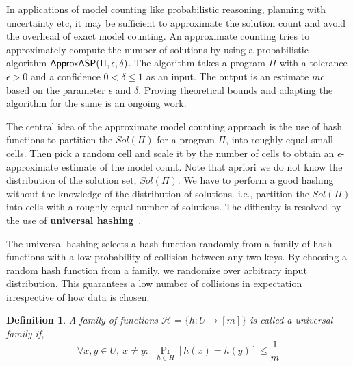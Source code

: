 \documentclass{article}
\newtheorem{definition}{Definition}
\newcommand{\fff}{\ensuremath{\Pi}\xspace}
\newcommand{\mc}{$mc$\xspace}
\newcommand{\ep}{$\epsilon$\xspace}
\newcommand{\del}{$\delta$\xspace}
\def\appasp{\normalfont \textsf{ApproxASP}\xspace}
\newcommand{\sol}{$Sol(\Pi)$\xspace}
\begin{document}
In applications of model counting like probabilistic reasoning, planning with uncertainty etc, it may be sufficient to approximate the solution count and avoid the overhead of exact model counting.
%
An approximate counting tries to approximately compute the number of solutions by using a probabilistic algorithm $\appasp(\fff, \epsilon, \delta)$.
%
The algorithm takes a program $\fff$ with a tolerance $\epsilon > 0$ and a confidence $0 < \delta \leq 1$ as an input.
%
The output is an estimate \mc based on the parameter \ep and \del.
%
Proving theoretical bounds and adapting the algorithm for the same is an ongoing work.

The central idea of the approximate model counting approach is the use of hash functions to partition the \sol for a program $\fff$, into roughly equal small cells.
%
Then pick a random cell and scale it by the number of cells to obtain an \ep-approximate estimate of the model count.
%
Note that apriori we do not know the distribution of the solution set, \sol.
%
We have to perform a good hashing without the knowledge of the distribution of solutions. i.e., partition the $Sol(\Pi)$ into cells with a roughly equal number of solutions.
%
%
%
The difficulty is resolved by the use of \textbf{universal hashing}~\cite{DBLP:conf/stoc/CarterW77}.

The universal hashing selects a hash function randomly from a family of hash functions with a low probability of collision between any two keys. 
%
By choosing a random hash function from a family, we randomize over arbitrary input distribution. This guarantees a low number of collisions in expectation irrespective of how data is chosen.

\begin{definition}
A family of functions $\mathcal{H}=\{h: U \to [m]\}$  is called a universal family if,
\[ \forall x,y\in U,~x\neq y:~~\Pr _{h\in H}[h(x)=h(y)]\leq {\frac {1}{m}} \]
\end{definition}
\end{document}
